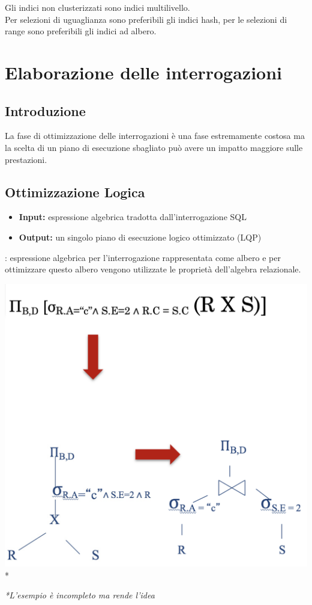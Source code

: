 \documentclass[12pt, a4paper]{report}
\begin{document}
    Gli indici non clusterizzati sono indici multilivello.\\
    Per selezioni di uguaglianza sono preferibili gli indici hash, per le selezioni di range sono preferibili gli indici ad albero.
    \chapter{Elaborazione delle interrogazioni}
    \section{Introduzione}
    La fase di ottimizzazione delle interrogazioni è una fase estremamente costosa ma la scelta di un piano di esecuzione sbagliato può avere un impatto maggiore sulle prestazioni.
    \section{Ottimizzazione Logica}
    \begin{itemize}
        \item \textbf{Input:} espressione algebrica tradotta dall'interrogazione SQL
        \item \textbf{Output:} un singolo piano di esecuzione logico ottimizzato (LQP)
    \end{itemize}
    : espressione algebrica per l'interrogazione rappresentata come albero e per ottimizzare questo albero vengono utilizzate le proprietà dell'algebra relazionale.
    \begin{center}
        \includegraphics[scale=0.4]{Appunti Latex/Immagini/esempioalberologicoottimizzato.png}*
    \end{center}
    \textit{*L'esempio è incompleto ma rende l'idea}
\end{document}
